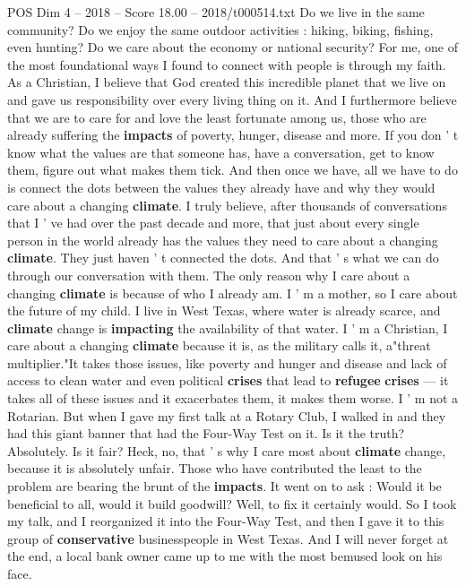 \begin{textsample}{POS Dim 4 – 2018 – Score 18.00 – 2018/t000514.txt}
Do we live in the same community?
Do we enjoy the same outdoor activities : hiking, biking, fishing, even hunting?
Do we care about the economy or national security?
For me, one of the most foundational ways I found to connect with people is through my faith.
As a Christian, I believe that God created this incredible planet that we live on and gave us responsibility over every living thing on it.
And I furthermore believe that we are to care for and love the least fortunate among us, those who are already suffering the \textbf{impacts} of poverty, hunger, disease and more.
If you don ' t know what the values are that someone has, have a conversation, get to know them, figure out what makes them tick.
And then once we have, all we have to do is connect the dots between the values they already have and why they would care about a changing \textbf{climate}.
I truly believe, after thousands of conversations that I ' ve had over the past decade and more, that just about every single person in the world already has the values they need to care about a changing \textbf{climate}.
They just haven ' t connected the dots.
And that ' s what we can do through our conversation with them.
The only reason why I care about a changing \textbf{climate} is because of who I already am.
I ' m a mother, so I care about the future of my child.
I live in West Texas, where water is already scarce, and \textbf{climate} change is \textbf{impacting} the availability of that water.
I ' m a Christian, I care about a changing \textbf{climate} because it is, as the military calls it, a"threat multiplier."It takes those issues, like poverty and hunger and disease and lack of access to clean water and even political \textbf{crises} that lead to \textbf{refugee} \textbf{crises} — it takes all of these issues and it exacerbates them, it makes them worse.
I ' m not a Rotarian.
But when I gave my first talk at a Rotary Club, I walked in and they had this giant banner that had the Four-Way Test on it.
Is it the truth?
Absolutely.
Is it fair?
Heck, no, that ' s why I care most about \textbf{climate} change, because it is absolutely unfair.
Those who have contributed the least to the problem are bearing the brunt of the \textbf{impacts}.
It went on to ask : Would it be beneficial to all, would it build goodwill?
Well, to fix it certainly would.
So I took my talk, and I reorganized it into the Four-Way Test, and then I gave it to this group of \textbf{conservative} businesspeople in West Texas.
And I will never forget at the end, a local bank owner came up to me with the most bemused look on his face.

\end{textsample}
